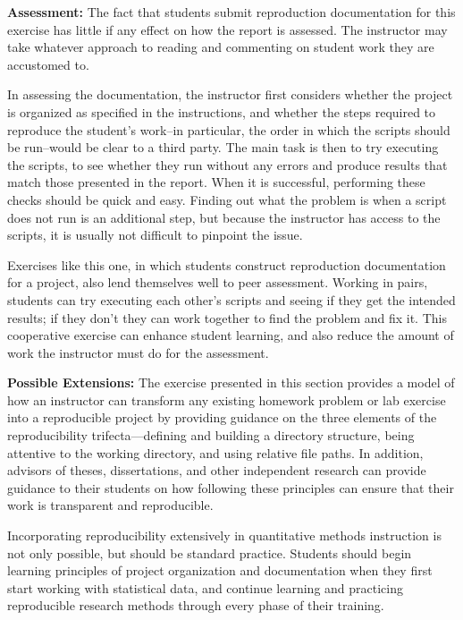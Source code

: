 \documentclass[
  12pt]{article}
\begin{document}
\textbf{Assessment:} The fact that students submit reproduction documentation for this exercise has little if any effect on how the report is assessed.
The instructor may take whatever approach to reading and commenting on student work they are accustomed to.

In assessing the documentation, the instructor first considers whether the project is organized as specified in the instructions, and whether the steps required to reproduce the student's work--in particular, the order in which the scripts should be run--would be clear to a third party. 
The main task is then to try executing the scripts, to see whether they run without any errors and produce results that match those presented in the report.  
When it is successful, performing these checks should be quick and easy.  
Finding out what the problem is when a script does not run is an additional step, but because the instructor has access to the scripts, it is usually not difficult to pinpoint the issue.

Exercises like this one, in which students construct reproduction documentation for a project, also lend themselves well to peer assessment.  
Working in pairs, students can try executing each other’s scripts and seeing if they get the intended results; if they don’t they can work together to find the problem and fix it.  
This cooperative exercise can enhance student learning, and also reduce the amount of work the instructor must do for the assessment.

\textbf{Possible Extensions:}
The exercise presented in this section provides a model of how an instructor can transform any existing homework problem or lab exercise into a reproducible project by providing guidance on the three elements of the reproducibility trifecta---defining and building a directory structure, being attentive to the working directory, and using relative file paths.  
In addition, advisors of theses, dissertations, and other independent research can provide guidance to their students on how following these principles can ensure that their work is transparent and reproducible.

Incorporating reproducibility extensively in quantitative methods instruction is not only possible, but should be standard practice.  
Students should begin learning principles of project organization and documentation when they first start working with statistical data, and continue learning and practicing reproducible research methods through every phase of their training.
\end{document}
